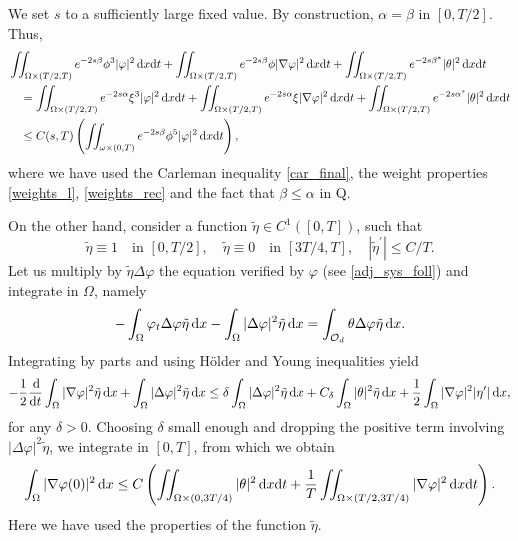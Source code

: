 \documentclass{aims}
\theoremstyle{definition}
\def\dx{\,\textnormal{d}x}
\def\dt{\textnormal{d}t}
\def\d{\,\textnormal{d}}
\begin{document}
We set $s$ to a sufficiently large fixed value. By construction, $\alpha=\beta$ in $[0,T/2]$. Thus, 
%
\begin{align} \notag 
&\iint_{\Omega\times(T/2,T)}e^{-2s\beta}\phi^3|\varphi|^2\dx\dt+\iint_{\Omega\times(T/2,T)}e^{-2s\beta}\phi|\nabla \varphi|^2\dx\dt+\iint_{\Omega\times(T/2,T)}e^{-2s\beta^*}|\theta|^2\dx\dt  \\ \notag
&\quad = \iint_{\Omega\times(T/2,T)}e^{-2s\alpha}\xi^3|\varphi|^2\dx\dt + \iint_{\Omega\times(T/2,T)}e^{-2s\alpha}\xi|\nabla\varphi|^2\dx\dt + \iint_{\Omega\times(T/2,T)}e^{-2s\alpha^*}|\theta|^2\dx\dt \\ \label{car_rec}
&\quad \leq  C(s,T)\left(\iint_{\omega\times(0,T)}e^{-2s\beta}\phi^5|\varphi|^2\dx\dt\right),
\end{align}
%
where we have used the Carleman inequality \eqref{car_final}, the weight properties \eqref{weights_l}, \eqref{weights_rec} and the fact that $\beta\leq \alpha$ in Q. 

On the other hand, consider a function $\tilde \eta\in C^1([0,T])$, such that 
%
\begin{equation*}
\tilde\eta \equiv 1 \quad\text{in } [0,T/2], \quad \tilde\eta\equiv 0 \quad \text{in } [3T/4,T], \quad |\tilde\eta^\prime|\leq C/T.
\end{equation*}
%
Let us multiply by $\tilde\eta\Delta\varphi$ the equation verified by $\varphi$ (see \eqref{adj_sys_foll}) and integrate in $\Omega$, namely 
%
\begin{equation*}
-\int_{\Omega}\varphi_t\Delta\varphi\tilde\eta\dx-\int_{\Omega}|\Delta \varphi|^2\tilde\eta\dx=\int_{\mathcal O_d}\theta\Delta\varphi\tilde \eta\dx.
\end{equation*}
%
Integrating by parts and using H\"older and Young inequalities yield
%
\begin{equation*}
-\frac{1}{2}\frac{\d}{\dt}\int_{\Omega}|\nabla\varphi|^2\tilde\eta\dx+\int_{\Omega}|\Delta\varphi|^2\tilde\eta\dx\leq \delta \int_{\Omega}|\Delta\varphi|^2\tilde\eta\dx+C_\delta\int_{\Omega}|\theta|^2\tilde\eta\dx+\frac{1}{2}\int_{\Omega}|\nabla\varphi|^2|\eta^\prime|\dx,
\end{equation*}
%
for any $\delta>0$.  Choosing $\delta$ small enough and dropping the positive term involving $|\Delta\varphi|^2\tilde\eta$, we integrate in $[0,T]$, from which we obtain
%
\begin{equation}\label{nabla_theta_0}
\int_{\Omega}|\nabla\varphi(0)|^2\dx\leq C\left(\iint_{\Omega\times(0,3T/4)}|\theta|^2\dx\dt+\frac{1}{T}\iint_{\Omega\times(T/2,3T/4)}|\nabla\varphi|^2\dx\dt\right).
\end{equation}
%
Here we have used the properties of the function $\tilde\eta$. 
\end{document}
